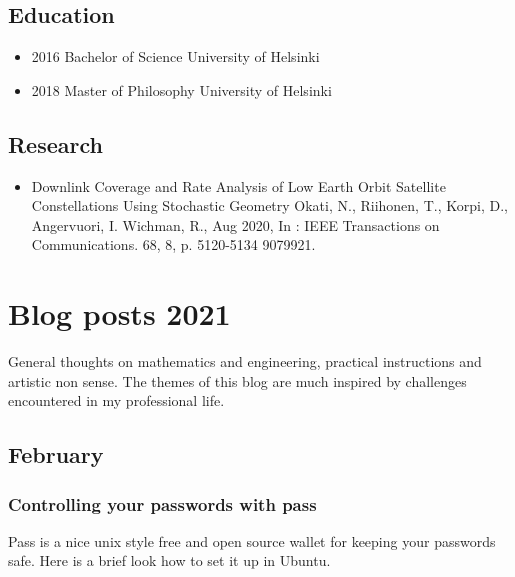 \documentclass{article}
\begin{document}
\subsection{Education}
\begin{itemize}
\item 2016 Bachelor of Science University of Helsinki\\
\item 2018 Master of Philosophy University of Helsinki
\end{itemize}
\subsection{Research}

\begin{itemize}
\item Downlink Coverage and Rate Analysis of Low Earth Orbit Satellite Constellations Using Stochastic Geometry
Okati, N., Riihonen, T., Korpi, D., Angervuori, I. Wichman, R., Aug 2020, In : IEEE Transactions on Communications. 68, 8, p. 5120-5134 9079921.\\
\end{itemize}


\section{Blog posts 2021}
General thoughts on mathematics and engineering, practical instructions and artistic non sense. The themes of this blog are much inspired by challenges encountered in my professional life.

\subsection{February}
\subsubsection{Controlling your passwords with pass}
Pass is a nice unix style free and open source wallet for keeping your passwords safe. Here is a brief look how to set it up in Ubuntu.
\end{document}
